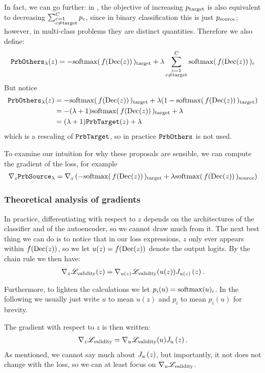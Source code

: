 \documentclass[../main.tex]{subfiles}
\begin{document}
In fact, we can go further:
in \ls{}, the objective of increasing $p_\target$ is also equivalent to decreasing
$
\sum_{
    \begin{subarray}{l}
        c=1 \\
        c \neq \target
    \end{subarray}
    }^\outputdim p_c
$,
since in binary classification this is just $p_\source$; however, in multi-class problems they are distinct quantities.
Therefore we also define:
\begin{align*}
    \PrbOthers{\lambda}(z) = -  \sfdec_\target + \lambda \mysum{c}  \sfdec_c
\end{align*}
But notice
\begin{align*}
    \PrbOthers{\lambda}(z)
     & = -  \sfdec_\target + \lambda (1 -  \sfdec_\target) \\
     & = -(\lambda + 1)  \sfdec_\target + \lambda \\
     & = (\lambda + 1) \PrbTarget(z) + \lambda
\end{align*}
which is a rescaling of $\PrbTarget$, so in practice $\PrbOthers{}$ is not used.

To examine our intuition for why these proposals are sensible, we can compute the gradient of the loss, for example
\begin{align*}
\grad{\PrbSource{\lambda}}{z}
=  \grad{ \left( -  \sfdec_\target + \lambda  \sfdec_\source \right) }{z}
\end{align*}

\subsubsection{Theoretical analysis of gradients}

In practice, differentiating with respect to $z$ depends on the architectures of the classifier and of
the autoencoder, so we cannot draw much from it.
The next best thing we can do is to notice that in our loss expressions,
$z$ only ever appears within $f(\dec(z))$,
so we let $u(z) = f(\dec(z))$ denote the output logits.
By the chain rule we then have:
\begin{align*}
 \grad{\lossval(z)}{z} = \grad{\lossval(u(z))}{u(z)} \jac{u(z)}{z}.
\end{align*}

Furthermore, to lighten the calculations we let $p_i(u) = \softmax(u)_i$.
In the following we usually just write $u$ to mean $u(z)$ and $p_i$ to mean $p_i(u)$ for brevity.

The gradient with respect to $z$ is then written:
\begin{align*}
 \grad{\lossval}{z} = \grad{\lossval(u)}{u} \jac{u}{z}.
\end{align*}
As mentioned, we cannot say much about $\jac{u}{z}$, but importantly, it not does not change with the loss,
so we can at least focus on $\grad{\lossval}{u}$.
\end{document}

